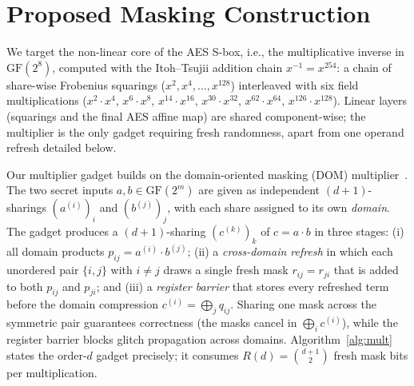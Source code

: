 \documentclass[lettersize,journal]{IEEEtran}
\newcommand{\GF}{\mathrm{GF}}
\newcommand{\share}[2]{#1^{(#2)}}
\begin{document}
\section{Proposed Masking Construction}
\label{sec:construction}
We target the non-linear core of the AES S-box, i.e., the multiplicative inverse
in $\GF(2^8)$, computed with the Itoh--Tsujii addition chain
$x^{-1}=x^{254}$: a chain of share-wise Frobenius squarings
($x^{2},x^{4},\dots,x^{128}$) interleaved with six field multiplications
($x^{2}{\cdot}x^{4}$, $x^{6}{\cdot}x^{8}$, $x^{14}{\cdot}x^{16}$,
$x^{30}{\cdot}x^{32}$, $x^{62}{\cdot}x^{64}$, $x^{126}{\cdot}x^{128}$).
Linear layers (squarings and the final AES affine map) are shared
component-wise; the multiplier is the only gadget requiring fresh
randomness, apart from one operand refresh detailed below.

Our multiplier gadget builds on the domain-oriented masking (DOM)
multiplier~\cite{gross2016dom}. The two secret inputs $a,b\in\GF(2^m)$ are given
as independent $(d{+}1)$-sharings $(\share{a}{i})_{i}$ and $(\share{b}{j})_{j}$,
with each share assigned to its own \emph{domain}. The gadget produces a
$(d{+}1)$-sharing $(\share{c}{k})_{k}$ of $c=a\cdot b$ in three stages:
(i) all domain products $p_{ij}=\share{a}{i}\cdot\share{b}{j}$;
(ii) a \emph{cross-domain refresh} in which each unordered pair $\{i,j\}$ with
$i\neq j$ draws a single fresh mask $r_{ij}=r_{ji}$ that is added to both
$p_{ij}$ and $p_{ji}$; and (iii) a \emph{register barrier} that stores every
refreshed term before the domain compression $\share{c}{i}=\bigoplus_j q_{ij}$.
Sharing one mask across the symmetric pair guarantees correctness (the masks
cancel in $\bigoplus_i\share{c}{i}$), while the register barrier blocks glitch
propagation across domains. Algorithm~\ref{alg:mult} states the order-$d$ gadget
precisely; it consumes $R(d)=\binom{d+1}{2}$ fresh mask bits per multiplication.
\end{document}
